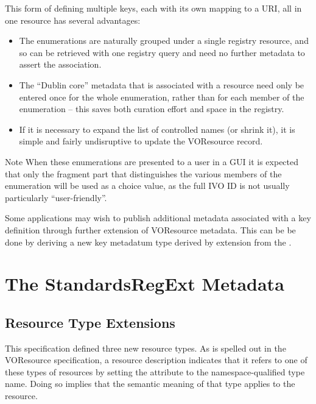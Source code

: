 \documentclass[11pt,a4paper]{ivoa}
\begin{document}
This form of defining multiple keys, each with its own mapping to a
URI, all in one resource has several advantages:



\begin{itemize}

\item  The enumerations are naturally grouped under a single registry
       resource, and so can be retrieved with one registry query and
       need no further metadata to assert the association.

\item  The ``Dublin core'' metadata that is associated with a resource
       need only be entered once for the whole enumeration, rather
       than for each member of the enumeration -- this  saves both
       curation effort and space in the registry.

\item  If it is necessary to expand the list of controlled names (or
       shrink it), it is simple and fairly undisruptive to update the
       VOResource record.

\end{itemize}

\begin{admonition}{Note}
       When these enumerations are presented to a user in a GUI it is
       expected that only the fragment part that distinguishes
       the various members of the enumeration will be used as a choice
       value, as the full IVO ID is not usually particularly
       ``user-friendly''. 
\end{admonition}

Some applications may wish to publish additional metadata associated
with a key definition through further extension of VOResource
metadata.  This can be be done by deriving a new key metadatum type
derived by extension from the .  



\section{The StandardsRegExt Metadata}

\subsection{Resource Type Extensions}

This specification defined three new resource types.  As is spelled
out in the VOResource specification, a resource description indicates
that it refers to one of these types of resources by setting the
 attribute to the namespace-qualified type name.
Doing so implies that the semantic meaning of that type applies to the
resource.  
\end{document}
